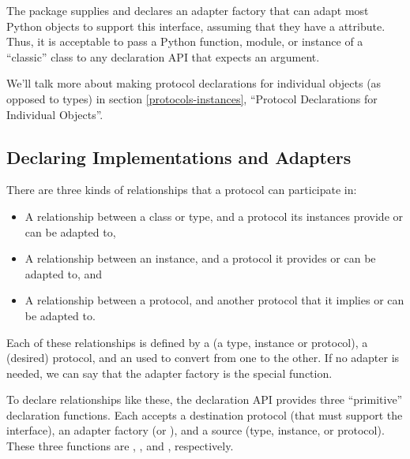 \begin{verbatim%
}
\begin{verbatim%
}
\begin{verbatim%
}
\begin{verbatim%
}
\begin{verbatim%
}
\begin{verbatim%
}
\begin{description}
The  package supplies and declares an adapter factory that
can adapt most Python objects to support this interface, assuming that they
have a  attribute.  Thus, it is acceptable to pass a Python
function, module, or instance of a  ``classic'' class to any declaration API
that expects an  argument.

We'll talk more about making protocol declarations for individual objects
(as opposed to types) in section \ref{protocols-instances}, ``Protocol
Declarations for Individual Objects''.

\end{description}











\subsection{Declaring Implementations and Adapters}
There are three kinds of relationships that a protocol can participate in:

\begin{itemize}
\item A relationship between a class or type, and a protocol its instances
provide or can be adapted to,

\item A relationship between an instance, and a protocol it provides or can
be adapted to, and

\item A relationship between a protocol, and another protocol that it implies
or can be adapted to.
\end{itemize}

Each of these relationships is defined by a  (a type,
instance or protocol), a  (desired) protocol, and an
 used to convert from one to the other.  If no adapter
is needed, we can say that the adapter factory is the special
 function.

To declare relationships like these, the  declaration API
provides three ``primitive'' declaration functions.  Each accepts a destination
protocol (that must support the  interface),
an adapter factory (or ), and a source (type,
instance, or protocol).  These three functions are
, , and
, respectively.


\end{verbatim%
}
\end{verbatim%
}
\end{verbatim%
}
\end{verbatim%
}
\end{verbatim%
}
\end{verbatim%
}
